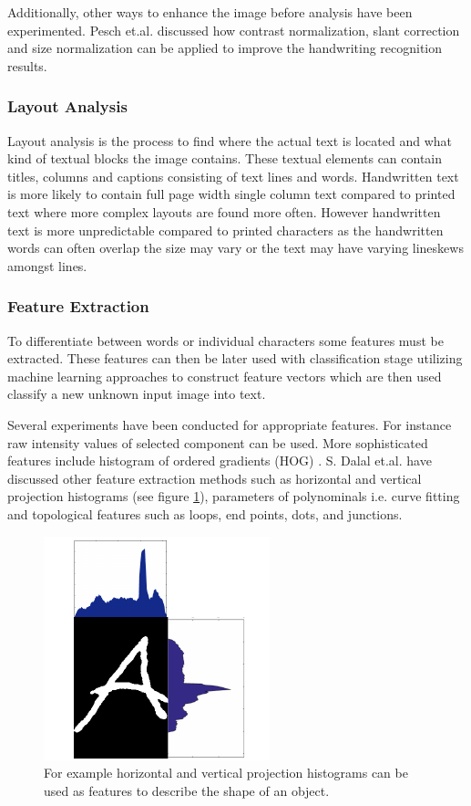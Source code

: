 \documentclass{article}
\begin{document}
        Additionally, other ways to enhance the image before analysis have been experimented. Pesch et.al. discussed how contrast normalization, slant correction and size normalization can be applied to improve the handwriting recognition results. \cite{Pesch2012}

      \subsubsection{Layout Analysis}
        Layout analysis is the process to find where the actual text is located and what kind of textual blocks the image contains. These textual elements can contain titles, columns and captions consisting of text lines and words. Handwritten text is more likely to contain full page width single column text compared to printed text where more complex layouts are found more often. However handwritten text is more unpredictable compared to printed characters as the handwritten words can often overlap the size may vary or the text may have varying lineskews amongst lines.

      \subsubsection{Feature Extraction}
        To differentiate between words or individual characters some features must be extracted. These features can then be later used with classification stage utilizing machine learning approaches to construct feature vectors which are then used classify a new unknown input image into text.

        Several experiments have been conducted for appropriate features. For instance raw intensity values of selected component can be used. More sophisticated features include histogram of ordered gradients (HOG) \cite{Dalal2005}. S. Dalal et.al. have discussed other feature extraction methods such as horizontal and vertical projection histograms (see figure \ref{fig:feature}), parameters of polynominals i.e. curve fitting and topological features such as loops, end points, dots, and junctions. \cite{Dalal}

        \begin{figure}
          \centering
          \includegraphics[natwidth=248,natheight=245,scale = 0.6]{feature_extraction.png}
          \caption{For example horizontal and vertical projection histograms can be used as features to describe the shape of an object.\label{fig:feature}}
        \end{figure}
\end{document}
